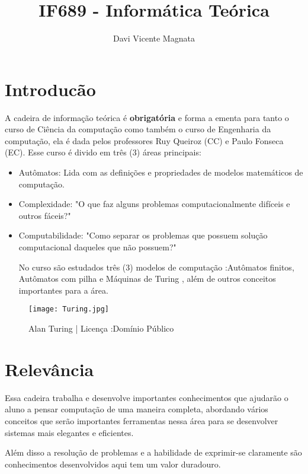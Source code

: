 \documentclass[a4paper]{article}
\title{IF689 - Informática Teórica}
\author{Davi Vicente Magnata}
\begin{document}
\maketitle



\section{Introducão}

\hspace{\parindent} A cadeira de informação teórica é \textbf{obrigatória} e forma a ementa para tanto o curso de Ciência da computação como também o curso de Engenharia da computação, ela é dada pelos professores Ruy Queiroz (CC) e Paulo Fonseca (EC).
    Esse curso é divido em três (3) áreas principais: 
\begin{itemize}
\item Autômatos: Lida com as definições e propriedades de modelos matemáticos de computação.


\item Complexidade: "O que faz alguns problemas computacionalmente difíceis e outros fáceis?"

\item Computabilidade: "Como separar os problemas que possuem solução computacional daqueles que não possuem?"

No curso são estudados três (3) modelos de computação :Autômatos finitos, Autômatos com pilha e Máquinas de Turing , além de outros conceitos importantes para a área.
\end{itemize}
    
    \begin{figure}[h]
\centering
\texttt{[image: Turing.jpg]}
\caption{\label{fig:frog}Alan Turing | Licença :Domínio Público}
\end{figure}

    

\section{Relevância}

\hspace{\parindent} Essa cadeira trabalha e desenvolve importantes conhecimentos que ajudarão o aluno a pensar computação de uma maneira completa, abordando vários conceitos que serão importantes ferramentas nessa área para se desenvolver sistemas mais elegantes e eficientes.

\hspace{\parindent} Além disso a resolução de problemas e a habilidade de exprimir-se claramente são conhecimentos desenvolvidos aqui tem um valor duradouro.
\end{document}
